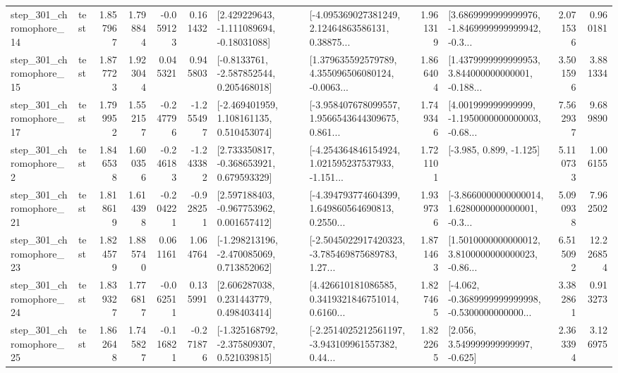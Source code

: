 \begin{tabular}{llrrrrllrlrr}
  step\_301\_chromophore\_14 &      test &      1.857967 &    1.798844 &     -0.059123 &  0.161432 &    [2.429229643, -1.111089694, -0.18031088] &  [-4.095369027381249, 2.12464863586131, 0.38875... &       1.961319 &  [3.6869999999999976, -1.8469999999999942, -0.3... &            2.071536 &          0.960181 \\
  step\_301\_chromophore\_15 &      test &      1.877723 &    1.923044 &      0.045321 &  0.945803 &     [-0.8133761, -2.587852544, 0.205468018] &  [1.379635592579789, 4.355096506080124, -0.0063... &       1.866404 &  [1.4379999999999953, 3.844000000000001, -0.188... &            3.501596 &          3.881334 \\
  step\_301\_chromophore\_17 &      test &      1.799952 &    1.552157 &     -0.247796 & -1.255497 &    [-2.469401959, 1.108161135, 0.510453074] &  [-3.958407678099557, 1.9566543644309675, 0.861... &       1.749346 &  [4.001999999999999, -1.1950000000000003, -0.68... &            7.562937 &          9.689890 \\
   step\_301\_chromophore\_2 &      test &      1.846538 &    1.600356 &     -0.246183 & -1.243382 &    [2.733350817, -0.368653921, 0.679593329] &  [-4.254364846154924, 1.021595237537933, -1.151... &       1.721101 &                            [-3.985, 0.899, -1.125] &            5.110733 &          1.006155 \\
  step\_301\_chromophore\_21 &      test &      1.818619 &    1.614398 &     -0.204221 & -0.928251 &    [2.597188403, -0.967753962, 0.001657412] &  [-4.394793774604399, 1.649860564690813, 0.2550... &       1.939736 &  [-3.8660000000000014, 1.6280000000000001, -0.3... &            5.090938 &          7.962502 \\
  step\_301\_chromophore\_23 &      test &      1.824579 &    1.885740 &      0.061161 &  1.064764 &   [-1.298213196, -2.470085069, 0.713852062] &  [-2.5045022917420323, -3.785469875689783, 1.27... &       1.871463 &  [1.5010000000000012, 3.8100000000000023, -0.86... &            6.515092 &         12.226854 \\
  step\_301\_chromophore\_24 &      test &      1.839327 &    1.776817 &     -0.062511 &  0.135991 &     [2.606287038, 0.231443779, 0.498403414] &  [4.426610181086585, 0.3419321846751014, 0.6160... &       1.827465 &  [-4.062, -0.3689999999999998, -0.5300000000000... &            3.382861 &          0.913273 \\
  step\_301\_chromophore\_25 &      test &      1.862648 &    1.745827 &     -0.116821 & -0.271876 &   [-1.325168792, -2.375809307, 0.521039815] &  [-2.2514025212561197, -3.943109961557382, 0.44... &       1.822265 &                 [2.056, 3.549999999999997, -0.625] &            2.363394 &          3.126975 \\

\end{tabular}

